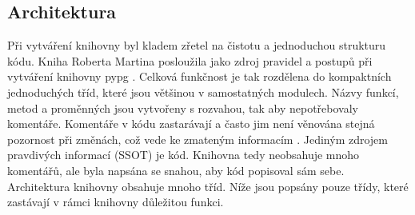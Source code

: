 \documentclass[ing,male,java,dept456]{diploma}						%
\begin{document}
\subsection{Architektura}

Při vytváření knihovny byl kladem zřetel na čistotu a jednoduchou strukturu kódu. Kniha Roberta Martina posloužila jako zdroj pravidel a postupů při vytváření knihovny pypg \cite{cleancode}. Celková funkčnost je tak rozdělena do kompaktních jednoduchých tříd, které jsou většinou v samostatných modulech. Názvy funkcí, metod a proměnných jsou vytvořeny s rozvahou, tak aby nepotřebovaly komentáře. Komentáře v kódu zastarávají a často jim není věnována stejná pozornost při změnách, což vede ke zmateným informacím  \cite{cleancode}. Jediným zdrojem pravdivých informací (SSOT) je kód. Knihovna tedy neobsahuje mnoho komentářů, ale byla napsána se snahou, aby kód popisoval sám sebe. \\
Architektura knihovny obsahuje mnoho tříd. Níže jsou popsány pouze třídy, které zastávají v rámci knihovny důležitou funkci.
\end{document}
